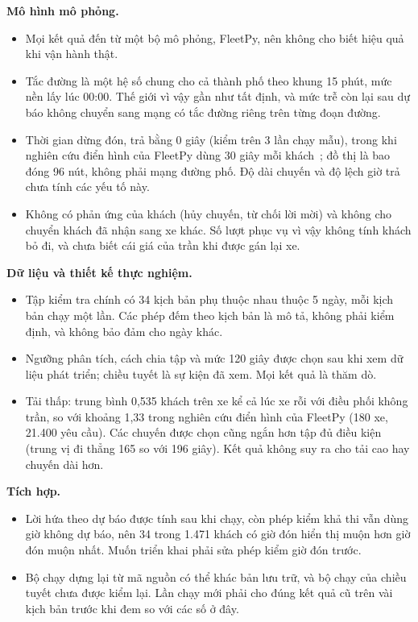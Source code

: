 \textbf{Mô hình mô phỏng.}
\begin{itemize}[leftmargin=1.2cm,itemsep=2pt,topsep=3pt]
\item Mọi kết quả đến từ một bộ mô phỏng, FleetPy, nên không cho biết hiệu quả khi vận hành thật.
\item Tắc đường là một hệ số chung cho cả thành phố theo khung 15 phút, mức nền lấy lúc 00:00. Thế giới vì vậy gần
như tất định, và mức trễ còn lại sau dự báo không chuyển sang mạng có tắc đường riêng trên từng đoạn đường.
\item Thời gian dừng đón, trả bằng 0 giây (kiểm trên 3 lần chạy mẫu), trong khi nghiên cứu điển hình của FleetPy dùng
30 giây mỗi khách~\cite{engelhardt2026}; đồ thị là bao đóng 96 nút, không phải mạng đường phố. Độ dài chuyến và độ
lệch giờ trả chưa tính các yếu tố này.
\item Không có phản ứng của khách (hủy chuyến, từ chối lời mời) và không cho chuyển khách đã nhận sang xe khác. Số
lượt phục vụ vì vậy không tính khách bỏ đi, và chưa biết cái giá của trần khi được gán lại xe.
\end{itemize}

\textbf{Dữ liệu và thiết kế thực nghiệm.}
\begin{itemize}[leftmargin=1.2cm,itemsep=2pt,topsep=3pt]
\item Tập kiểm tra chính có 34 kịch bản phụ thuộc nhau thuộc 5 ngày, mỗi kịch bản chạy một lần. Các phép đếm theo
kịch bản là mô tả, không phải kiểm định, và không bảo đảm cho ngày khác.
\item Ngưỡng phân tích, cách chia tập và mức 120 giây được chọn sau khi xem dữ liệu phát triển; chiều tuyết là sự
kiện đã xem. Mọi kết quả là thăm dò.
\item Tải thấp: trung bình 0,535 khách trên xe kể cả lúc xe rỗi với điều phối không trần, so với khoảng 1,33 trong
nghiên cứu điển hình của FleetPy (180 xe, 21.400 yêu cầu). Các chuyến được chọn cũng ngắn hơn tập đủ điều kiện (trung
vị đi thẳng 165 so với 196 giây). Kết quả không suy ra cho tải cao hay chuyến dài hơn.
\end{itemize}

\textbf{Tích hợp.}
\begin{itemize}[leftmargin=1.2cm,itemsep=2pt,topsep=3pt]
\item Lời hứa theo dự báo được tính sau khi chạy, còn phép kiểm khả thi vẫn dùng giờ không dự báo, nên 34 trong 1.471
khách có giờ đón hiển thị muộn hơn giờ đón muộn nhất. Muốn triển khai phải sửa phép kiểm giờ đón trước.
\item Bộ chạy dựng lại từ mã nguồn có thể khác bản lưu trữ, và bộ chạy của chiều tuyết chưa được kiểm lại. Lần chạy
mới phải cho đúng kết quả cũ trên vài kịch bản trước khi đem so với các số ở đây.
\end{itemize}

